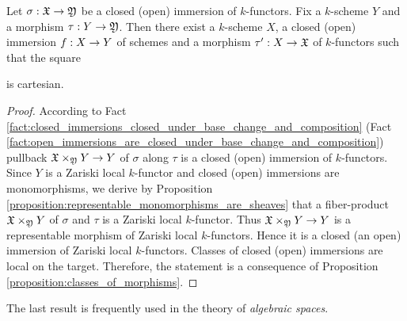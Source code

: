 \begin{proposition}\label{proposition:open_closed_immersions_for_arbitrary_k_functors}
Let $\sigma:{\mathfrak X}\rightarrow {\mathfrak Y}$ be a closed (open) immersion of $k$-functors. Fix a $k$-scheme $Y$ and a morphism $\tau:Y\rightarrow {\mathfrak Y}$. Then there exist a $k$-scheme $X$, a closed (open) immersion $f:X\rightarrow Y$ of schemes and a morphism $\tau':X\rightarrow {\mathfrak X}$ of $k$-functors such that the square
\begin{center}
\end{center}
is cartesian.
\end{proposition}
\begin{proof}
According to Fact \ref{fact:closed_immersions_closed_under_base_change_and_composition} (Fact \ref{fact:open_immersions_are_closed_under_base_change_and_composition}) pullback ${\mathfrak X}\times_{{\mathfrak Y}}Y\rightarrow Y$ of $\sigma$ along $\tau$ is a closed (open) immersion of $k$-functors. Since $Y$ is a Zariski local $k$-functor and closed (open) immersions are monomorphisms, we derive by Proposition \ref{proposition:representable_monomorphisms_are_sheaves} that a fiber-product ${\mathfrak X}\times_{{\mathfrak Y}}Y$ of $\sigma$ and $\tau$ is a Zariski local $k$-functor. Thus ${\mathfrak X}\times_{{\mathfrak Y}}Y\rightarrow Y$ is a representable morphism of Zariski local $k$-functors. Hence it is a closed (an open) immersion of Zariski local $k$-functors. Classes of closed (open) immersions are local on the target. Therefore, the statement is a consequence of Proposition \ref{proposition:classes_of_morphisms}.
\end{proof}
\noindent
The last result is frequently used in the theory of \textit{algebraic spaces}.

